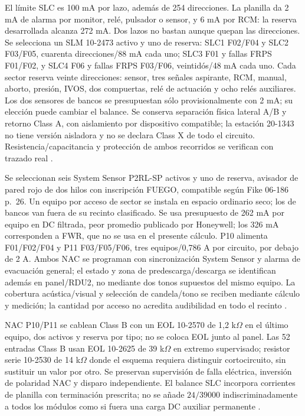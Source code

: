El límite SLC es 100 mA por lazo, además de 254 direcciones. La planilla da 2 mA de alarma por monitor, relé, pulsador o sensor, y 6 mA por RCM: la reserva desarrollada alcanza 272 mA. Dos lazos no bastan aunque quepan las direcciones. Se selecciona un SLM 10-2473 activo y uno de reserva: SLC1 F02/F04 y SLC2 F03/F05, cuarenta direcciones/88 mA cada uno; SLC3 F01 y fallas FRPS F01/F02, y SLC4 F06 y fallas FRPS F03/F06, veintidós/48 mA cada uno. Cada sector reserva veinte direcciones: sensor, tres señales aspirante, RCM, manual, aborto, presión, IVOS, dos compuertas, relé de actuación y ocho relés auxiliares. Los dos sensores de bancos se presupuestan sólo provisionalmente con 2 mA; su elección puede cambiar el balance. Se conserva separación física lateral A/B y retorno Class A, con aislamiento por dispositivo compatible; la estación 20-1343 no tiene versión aisladora y no se declara Class X de todo el circuito. Resistencia/capacitancia y protección de ambos recorridos se verifican con trazado real \parencite[pp.~3-5, 3-8 y ap.~A]{lote33-cheetah11}.

Se seleccionan seis System Sensor P2RL-SP activos y uno de reserva, avisador de pared rojo de dos hilos con inscripción FUEGO, compatible según Fike 06-186 p.~26. Un equipo por acceso de sector se instala en espacio ordinario seco; los de bancos van fuera de su recinto clasificado. Se usa presupuesto de 262 mA por equipo en DC filtrada, peor promedio publicado por Honeywell; los 326 mA corresponden a FWR, que no se usa en el presente cálculo. P10 alimenta F01/F02/F04 y P11 F03/F05/F06, tres equipos/0,786 A por circuito, por debajo de 2 A. Ambos NAC se programan con sincronización System Sensor y alarma de evacuación general; el estado y zona de predescarga/descarga se identifican además en panel/RDU2, no mediante dos tonos supuestos del mismo equipo. La cobertura acústica/visual y selección de candela/tono se reciben mediante cálculo y medición; la cantidad por acceso no acredita audibilidad en todo el recinto \parencite[secs.~3.1--3.3 y p.~26]{lote36-fike186}\parencite[p.~11, tabla~9]{lote36-honeywell54504}.

NAC P10/P11 se cablean Class B con un EOL 10-2570 de 1,2 k$\Omega$ en el último equipo, dos activos y reserva por tipo; no se coloca EOL junto al panel. Las 52 entradas Class B usan EOL 10-2625 de 39 k$\Omega$ en extremo supervisado; resistor serie 10-2530 de 14 k$\Omega$ donde el esquema requiera distinguir cortocircuito, sin sustituir un valor por otro. Se preservan supervisión de falla eléctrica, inversión de polaridad NAC y disparo independiente. El balance SLC incorpora corrientes de planilla con terminación prescrita; no se añade $24/39000$ indiscriminadamente a todos los módulos como si fuera una carga DC auxiliar permanente \parencite[secs.~3.9.2, 4.16.6 y ap.~C]{lote33-cheetah11}.

